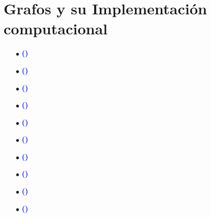 \documentclass[12pt]{article}
\begin{document}
\section{Grafos y su Implementación computacional}
{
    
    \begin{enumerate}
        \item[$\bullet$]\textbf{\textcolor{blue}{()}  }{}
        
        \item[$\bullet$]\textbf{\textcolor{blue}{()}  }{}
        
        \item[$\bullet$]\textbf{\textcolor{blue}{()}  }{}
        
        \item[$\bullet$]\textbf{\textcolor{blue}{()}  }{}
        
        \item[$\bullet$]\textbf{\textcolor{blue}{()}  }{}
        
        \item[$\bullet$]\textbf{\textcolor{blue}{()}  }{}
        
        \item[$\bullet$]\textbf{\textcolor{blue}{()}  }{}
        
        \item[$\bullet$]\textbf{\textcolor{blue}{()}  }{}
        
        \item[$\bullet$]\textbf{\textcolor{blue}{()}  }{}
        
        \item[$\bullet$]\textbf{\textcolor{blue}{()}  }{}
    \end{enumerate}

}
\end{document}
